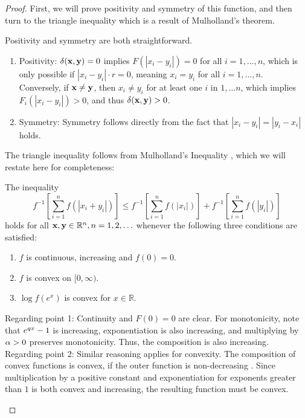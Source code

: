 \begin{proof}
	First, we will prove positivity and symmetry of this function, and then turn to the triangle inequality which is a result of Mulholland's theorem.
	\begin{proofpart}
		Positivity and symmetry are both straightforward.
		\begin{enumerate}
			\item Positivity: $\delta(\mathbf{x},\mathbf{y}) = 0$ implies $F(|x_i - y_i|) = 0$ for all $i=1, \dots, n$, which is only possible if $|x_i - y_i| \cdot r = 0$, meaning $x_i = y_i$ for all $i=1, \dots, n$.\\
			      Conversely, if $\mathbf{x} \neq \mathbf{y}$, then $x_i \neq y_i$ for at least one $i$ in $1, \dots n$, which implies $F_i(|x_i - y_i|) > 0$, and thus $\delta(\mathbf{x},\mathbf{y}) > 0$.
			\item Symmetry: Symmetry follows directly from the fact that $|x_i - y_i| = |y_i - x_i|$ holds.
		\end{enumerate}
	\end{proofpart}
	The triangle inequality follows from Mulholland's Inequality \parencite[p. 297]{mulholland}, which we will restate here for completeness:

	\begin{thm}
		The inequality
		$$
			f^{-1} \left[ \sum_{i=1}^n f(|x_i + y_i|) \right] \leq f^{-1}  \left[ \sum_{i=1}^n f(|x_i|) \right] + f^{-1} \left[ \sum_{i=1}^n f(|y_i|) \right]
		$$
		holds for all $\mathbf{x}, \mathbf{y} \in \mathbb{R}^n, n = 1, 2, \ldots$ whenever the following three conditions are satisfied:
		\begin{enumerate}
			\item $f$ is continuous, increasing and $f(0) = 0$.
			\item $f$ is convex on $[0, \infty)$.
			\item $\log f(e^x)$ is convex for $x \in \mathbb{R}$.
		\end{enumerate}
	\end{thm}

	\begin{proofpart}
		Regarding point 1: Continuity and $F(0) = 0$ are clear. For monotonicity, note that $e^{q x} - 1$ is increasing, exponentiation is also increasing, and multiplying by $\alpha > 0$ preserves monotonicity. Thus, the composition is also increasing.\\
		Regarding point 2: Similar reasoning applies for convexity. The composition of convex functions is convex, if the outer function is non-decreasing \parencite[p. 481, Note 207]{elementaryAna}. Since multiplication by a positive constant and exponentiation for exponents greater than $1$ is both convex and increasing, the resulting function must be convex.


\end{proofpart}
\end{proof}
